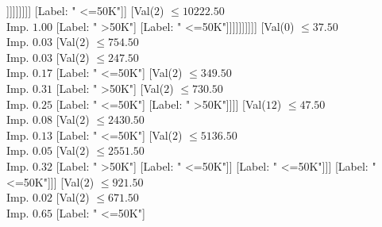 \documentclass[margin=10pt]{standalone}
\begin{document}
\begin{forest}
																							[Label: " >50K"]
																							[Val($2$) $ \leq 9827.50$ \\ Imp. $0.04$
																								[Label: " <=50K"]
																								[Val($2$) $ \leq 9853.50$ \\ Imp. $0.14$
																									[Label: " >50K"]
																									[Val($2$) $ \leq 9860.50$ \\ Imp. $0.05$
																										[Label: " >50K"]
																										[Val($2$) $ \leq 9968.50$ \\ Imp. $0.11$
																											[Label: " <=50K"]
																											[Val($2$) $ \leq 9986.50$ \\ Imp. $0.29$
																												[Label: " >50K"]
																												[Val($2$) $ \leq 10090.50$ \\ Imp. $0.31$
																													[Label: " <=50K"]
																													[Label: " >50K"]]]]]]]]]
																					[Label: " <=50K"]]
																				[Val($2$) $ \leq 10222.50$ \\ Imp. $1.00$
																					[Label: " >50K"]
																					[Label: " <=50K"]]]]]]]]]]
												[Val($0$) $ \leq 37.50$ \\ Imp. $0.03$
													[Val($2$) $ \leq 754.50$ \\ Imp. $0.03$
														[Val($2$) $ \leq 247.50$ \\ Imp. $0.17$
															[Label: " <=50K"]
															[Val($2$) $ \leq 349.50$ \\ Imp. $0.31$
																[Label: " >50K"]
																[Val($2$) $ \leq 730.50$ \\ Imp. $0.25$
																	[Label: " <=50K"]
																	[Label: " >50K"]]]]
														[Val($12$) $ \leq 47.50$ \\ Imp. $0.08$
															[Val($2$) $ \leq 2430.50$ \\ Imp. $0.13$
																[Label: " <=50K"]
																[Val($2$) $ \leq 5136.50$ \\ Imp. $0.05$
																	[Val($2$) $ \leq 2551.50$ \\ Imp. $0.32$
																		[Label: " >50K"]
																		[Label: " <=50K"]]
																	[Label: " <=50K"]]]
															[Label: " <=50K"]]]
													[Val($2$) $ \leq 921.50$ \\ Imp. $0.02$
														[Val($2$) $ \leq 671.50$ \\ Imp. $0.65$
															[Label: " <=50K"]

\end{forest}
\end{document}
